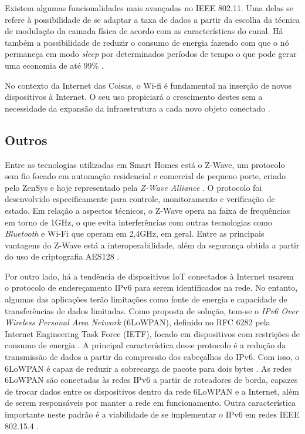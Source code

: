 

Existem algumas funcionalidades mais avançadas no IEEE 802.11. Uma delas se refere à possibilidade de se adaptar a taxa de dados a partir da escolha da técnica de modulação da camada física de acordo com as características do canal. Há também a possibilidade de reduzir o consumo de energia fazendo com que o nó permaneça em modo \textit{sleep} por determinados períodos de tempo o que pode gerar uma economia de até 99\% \cite{Kurose2012}.

No contexto da Internet das Coisas, o Wi-fi é fundamental na inserção de novos dispositivos à Internet. O seu uso propiciará o crescimento destes sem a necessidade da expansão da infraestrutura a cada novo objeto conectado \cite{Suresh2014}.

\subsection{Outros}
Entre as tecnologias utilizadas em Smart Homes está o Z-Wave, um protocolo sem fio focado em automação residencial e comercial de pequeno porte, criado pelo ZenSys e hoje representado pela \textit{Z-Wave Alliance } \cite{Gomez2010}. O protocolo foi desenvolvido especificamente para controle, monitoramento e verificação de estado. Em relação a aspectos técnicos, o Z-Wave opera na faixa de frequências em torno de 1GHz, o que evita interferências com outras tecnologias como \textit{Bluetooth} e Wi-Fi que operam em 2,4GHz, em geral. Entre as principais vantagens do Z-Wave está a interoperabilidade, além da segurança obtida a partir do uso de criptografia  AES128 \cite{Z-WaveAlliance2015}.


Por outro lado, há a tendência de dispositivos IoT conectados à Internet usarem o protocolo de endereçamento IPv6 para serem identificados na rede. No entanto, algumas das aplicações terão limitações como fonte de energia e capacidade de transferências de dados limitadas. Como proposta de solução, tem-se o \textit{IPv6 Over Wireless Personal Area Network} (6LoWPAN), definido no RFC 6282 pela Internet Engineering Task Force (IETF), focado em dispositivos com restrições de consumo de energia \cite{Olsson2014}. A principal característica desse protocolo é a redução da transmissão de dados a partir da compressão dos cabeçalhos do IPv6. Com isso, o 6LoWPAN é capaz de reduzir a sobrecarga de pacote para dois bytes \cite{Al-Fuqaha2015}. As redes 6LoWPAN são conectadas às redes IPv6 a partir de roteadores de borda, capazes de trocar dados entre os dispositivos dentro da rede 6LoWPAN e a Internet, além de serem responsáveis por manter a rede em funcionamento. Outra característica importante neste padrão é a viabilidade de se implementar o IPv6 em redes IEEE 802.15.4 \cite{Olsson2014}.

